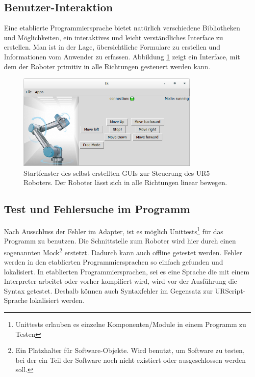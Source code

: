 \subsection{Benutzer-Interaktion}
\label{user_interaktion_mit_hoerherer_schicht}

Eine etablierte Programmiersprache bietet natürlich verschiedene Bibliotheken und Möglichkeiten, ein interaktives und leicht verständliches Interface zu erstellen. Man ist in der Lage, übersichtliche Formulare zu erstellen und Informationen vom Anwender zu erfassen. Abbildung \ref{fig:hda_urcontrol_gui} zeigt ein Interface, mit dem der Roboter primitiv in alle Richtungen gesteuert werden kann.

\begin{figure}[H]
  \centering
    \includegraphics[width=0.8\textwidth]{pic/hda_urcontrol_gui.png}
      \caption[Selbsterstelltes GUI zur Steuerung des UR5 Roboters]{Startfenster des selbst erstellten GUIs zur Steuerung des UR5 Roboters. Der Roboter lässt sich in alle Richtungen linear bewegen.}
      \label{fig:hda_urcontrol_gui}
\end{figure}

\subsection{Test und Fehlersuche im Programm}
\label{debuggen_mit_hoeherer schicht}

Nach Ausschluss der Fehler im Adapter, ist es möglich Unittests\footnote{Unittests erlauben es einzelne Komponenten/Module in einem Programm zu Testen} für das Programm zu benutzen. Die Schnittstelle zum Roboter wird hier durch einen sogenannten Mock\footnote{Ein Platzhalter für Software-Objekte. Wird benutzt, um Software zu testen, bei der ein Teil der Software noch nicht existiert oder ausgeschlossen werden soll.} erstetzt. Dadurch kann auch offline getestet werden. Fehler werden in den etablierten Programmiersprachen so einfach gefunden und lokalisiert. In etablierten Programmiersprachen, sei es eine Sprache die mit einem Interpreter arbeitet oder vorher kompiliert wird, wird vor der Ausführung die Syntax getestet. Deshalb können auch Syntaxfehler im Gegensatz zur URScript-Sprache lokalisiert werden.

